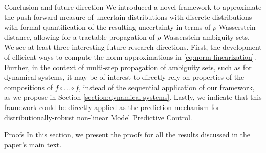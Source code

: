 \documentclass[11pt, a4paper, oneside,reqno]{amsart}
\makeatletter
\def\section{\@startsection{section}{1}%
	\z@{.7\linespacing\@plus\linespacing}{.5\linespacing}%
	{\normalfont\large\bfseries}}
\theoremstyle{plain}
\makeatother
\begin{document}
\section{Conclusion and future direction}\label{section:conclusion}
We introduced a novel framework to approximate the push-forward measure of uncertain distributions with discrete distributions with formal quantification of the resulting uncertainty in terms of $\rho$-Wasserstein distance, allowing for a tractable propagation of $\rho$-Wasserstein ambiguity sets. 
We see at least three interesting future research directions. 
First, the development of efficient ways to compute the norm approximations in \eqref{eq:norm-linearization}. 
Further, in the context of multi-step propagation of ambiguity sets, such as for dynamical systems, it may be of interest to directly rely on properties of the compositions of $f \circ ... \circ f$, instead of the sequential application of our framework, as we propose in Section \ref{section:dynamical-systems}. Lastly, we indicate that this framework could be directly applied as the prediction mechanism for distributionally-robust non-linear Model Predictive Control.

\appendix
\section{Proofs}\label{section:proofs}
In this section, we present the proofs for all the results discussed in the paper's main text.
\end{document}

